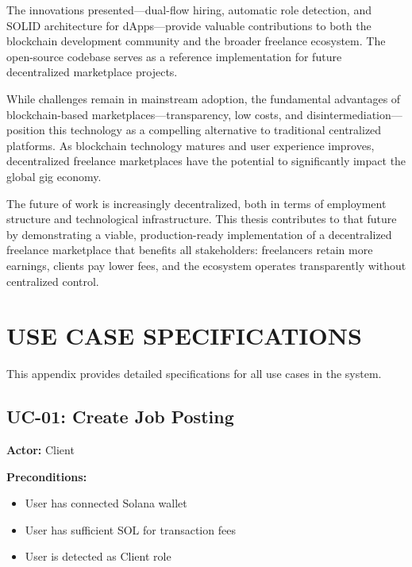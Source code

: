 \documentclass[a4paper,13pt,twoside]{report}
\theoremstyle{definition}
\begin{document}
The innovations presented—dual-flow hiring, automatic role detection, and SOLID architecture for dApps—provide valuable contributions to both the blockchain development community and the broader freelance ecosystem. The open-source codebase serves as a reference implementation for future decentralized marketplace projects.

While challenges remain in mainstream adoption, the fundamental advantages of blockchain-based marketplaces—transparency, low costs, and disintermediation—position this technology as a compelling alternative to traditional centralized platforms. As blockchain technology matures and user experience improves, decentralized freelance marketplaces have the potential to significantly impact the global gig economy.

The future of work is increasingly decentralized, both in terms of employment structure and technological infrastructure. This thesis contributes to that future by demonstrating a viable, production-ready implementation of a decentralized freelance marketplace that benefits all stakeholders: freelancers retain more earnings, clients pay lower fees, and the ecosystem operates transparently without centralized control.

\newpage
\appendix

\chapter{USE CASE SPECIFICATIONS}
\label{appendix:usecases}

This appendix provides detailed specifications for all use cases in the system.

\section{UC-01: Create Job Posting}

\textbf{Actor:} Client

\textbf{Preconditions:}
\begin{itemize}
    \item User has connected Solana wallet
    \item User has sufficient SOL for transaction fees
    \item User is detected as Client role
\end{itemize}
\end{document}
